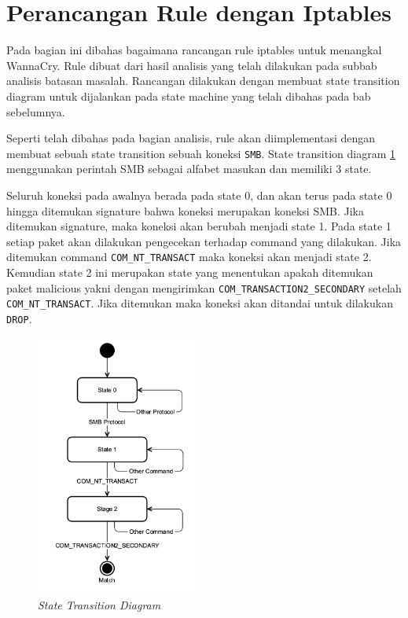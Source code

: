 \section{Perancangan Rule dengan Iptables}

Pada bagian ini dibahas bagaimana rancangan rule iptables untuk menangkal WannaCry. Rule dibuat dari hasil analisis yang telah dilakukan pada subbab analisis batasan masalah. Rancangan dilakukan dengan membuat state transition diagram untuk dijalankan pada state machine yang telah dibahas pada bab sebelumnya.

Seperti telah dibahas pada bagian analisis, rule akan diimplementasi dengan membuat sebuah state transition sebuah koneksi \verb|SMB|. State transition diagram \ref{fig:state_transition_diagram} menggunakan perintah SMB sebagai alfabet masukan dan memiliki 3 state.

Seluruh koneksi pada awalnya berada pada state 0, dan akan terus pada state 0 hingga ditemukan signature bahwa koneksi merupakan koneksi SMB. Jika ditemukan signature, maka koneksi akan berubah menjadi state 1. Pada state 1 setiap paket akan dilakukan pengecekan terhadap command yang dilakukan. Jika ditemukan command \verb|COM_NT_TRANSACT| maka koneksi akan menjadi state 2. Kemudian state 2 ini merupakan state yang menentukan apakah ditemukan paket malicious yakni dengan mengirimkan \verb|COM_TRANSACTION2_SECONDARY| setelah \verb|COM_NT_TRANSACT|. Jika ditemukan maka koneksi akan ditandai untuk dilakukan \verb|DROP|.

\begin{figure}[H]
	\centering
	\includegraphics[width=200px]{resources/ngfilter_state_diagram.png}
	\caption{\textit{State Transition Diagram}}
	\label{fig:state_transition_diagram}
\end{figure}

